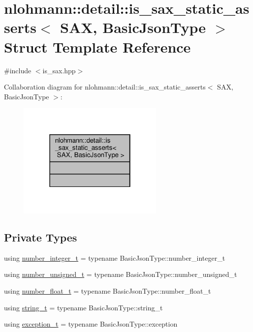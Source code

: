 \hypertarget{structnlohmann_1_1detail_1_1is__sax__static__asserts}{}\section{nlohmann\+:\+:detail\+:\+:is\+\_\+sax\+\_\+static\+\_\+asserts$<$ S\+AX, Basic\+Json\+Type $>$ Struct Template Reference}
\label{structnlohmann_1_1detail_1_1is__sax__static__asserts}


{\ttfamily \#include $<$is\+\_\+sax.\+hpp$>$}



Collaboration diagram for nlohmann\+:\+:detail\+:\+:is\+\_\+sax\+\_\+static\+\_\+asserts$<$ S\+AX, Basic\+Json\+Type $>$\+:\nopagebreak
\begin{figure}[H]
\begin{center}
\leavevmode
\includegraphics[width=202pt]{structnlohmann_1_1detail_1_1is__sax__static__asserts__coll__graph}
\end{center}
\end{figure}
\subsection*{Private Types}
\begin{DoxyCompactItemize}
\item 
using \hyperlink{structnlohmann_1_1detail_1_1is__sax__static__asserts_a474adf99bf1eaa8292284fd3064c80fe}{number\+\_\+integer\+\_\+t} = typename Basic\+Json\+Type\+::number\+\_\+integer\+\_\+t
\item 
using \hyperlink{structnlohmann_1_1detail_1_1is__sax__static__asserts_af8733df7fcaebb25434285885db7f127}{number\+\_\+unsigned\+\_\+t} = typename Basic\+Json\+Type\+::number\+\_\+unsigned\+\_\+t
\item 
using \hyperlink{structnlohmann_1_1detail_1_1is__sax__static__asserts_a65d4be40c41ddc31fd2c3583d87d5faf}{number\+\_\+float\+\_\+t} = typename Basic\+Json\+Type\+::number\+\_\+float\+\_\+t
\item 
using \hyperlink{structnlohmann_1_1detail_1_1is__sax__static__asserts_a067c98d2145bb54d862f4794ac1287bb}{string\+\_\+t} = typename Basic\+Json\+Type\+::string\+\_\+t
\item 
using \hyperlink{structnlohmann_1_1detail_1_1is__sax__static__asserts_a34e1bc8ab7adbbab5f7d8c45a964020b}{exception\+\_\+t} = typename Basic\+Json\+Type\+::exception
\end{DoxyCompactItemize}


